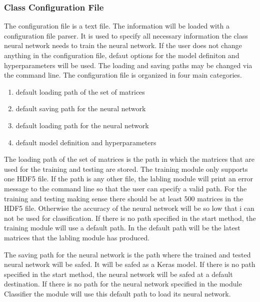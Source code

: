\documentclass[parskip=full]{scrartcl}
\begin{document}
\subsubsection{Class Configuration File}
The configuration file is a text file. The information will be loaded with a configuration file parser.
It is used to specify all necessary information the class \gls{neural network} needs to train the neural network.
If the user does not change anything in the configuration file, defaut options for the model definiton and hyperparameters will be used.
The loading and saving paths may be changed via the command line. The configuration file is organized in four main categories.
\begin{enumerate}
\item default loading path of the set of matrices 
\item default saving path for the \gls{neural network}
\item default loading path for the \gls{neural network}
\item default model definition and hyperparameters
\end{enumerate}
The loading path of the set of matrices is the path in which the matrices that are used for the training and testing are stored.
The training module only supports one \gls{HDF5} file.
If the path is any other file, the labling module will print an error message to the command line so that the user can specify a valid path.
For the training and testing making sense there should be at least 500 matrices in the \gls{HDF5} file.
Otherwise the accuracy of the \gls{neural network} will be so low that i can not be used for classification.
If there is no path specified in the start method, the training module will use a default path.
In the default path will be the latest matrices that the labling module has produced. \newline

The saving path for the \gls{neural network} is the path where the trained and tested \gls{neural network} will be safed.
It will be safed as a Keras model.
If there is no path specified in the start method, the \gls{neural network} will be safed at a default destination.
If there is no path for the \gls{neural network} specified in the module Classifier the module will use this default path to load its \gls{neural network}.\newline
\end{document}
